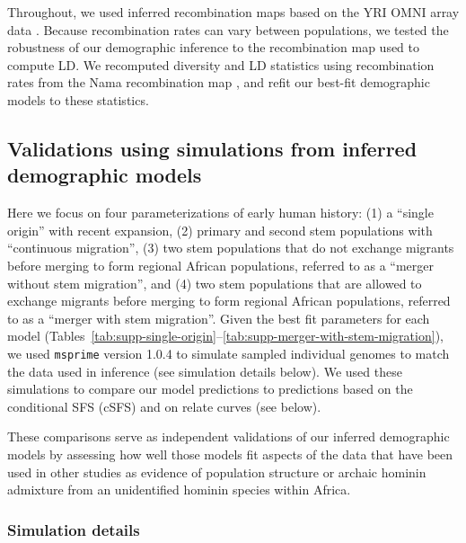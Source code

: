 \documentclass[]{article}
\newcommand{\msprime}{\texttt{msprime}\xspace}
\begin{document}
Throughout, we used inferred recombination maps based on the YRI OMNI array
data \citep{1000_Genomes_Project_Consortium2015-zq}. Because recombination
rates can vary between populations, we tested the robustness of our demographic
inference to the recombination map used to compute LD. We recomputed diversity
and LD statistics using recombination rates from the Nama recombination map
\citep{Van_Eeden2022-od}, and refit our best-fit demographic models to these
statistics.

\subsection{Validations using simulations from inferred demographic models}

Here we focus on four parameterizations of early human history: (1) a “single
origin” with recent expansion, (2) primary and second stem populations with
“continuous migration”, (3) two stem populations that do not exchange migrants
before merging to form regional African populations, referred to as a “merger
without stem migration”, and (4) two stem populations that are allowed to
exchange migrants before merging to form regional African populations, referred
to as a “merger with stem migration”. Given the best fit parameters for each
model
(Tables~\ref{tab:supp-single-origin}--\ref{tab:supp-merger-with-stem-migration}),
we used \msprime version 1.0.4 \citep{Kelleher2016-lw,Baumdicker2022-mj} to
simulate sampled individual genomes to match the data used in inference (see
simulation details below). We used these simulations to compare our model predictions to 
predictions based on the conditional SFS (cSFS) and on relate curves (see below).  

These comparisons serve as independent validations
of our inferred demographic models by assessing how well those models fit
aspects of the data that have been used in other studies as evidence of
population structure or archaic hominin admixture from an unidentified hominin species
within Africa.

\subsubsection{Simulation details}
\end{document}
